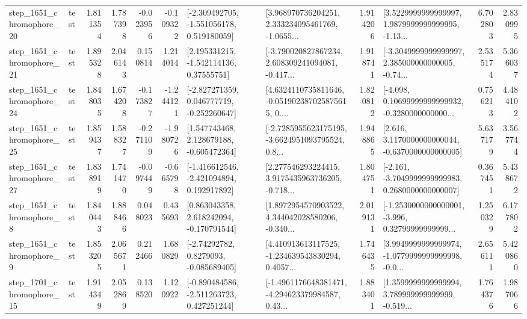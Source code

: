 \begin{tabular}{llrrrrllrlrr}
 step\_1651\_chromophore\_20 &      test &      1.811354 &    1.787398 &     -0.023956 & -0.109322 &   [-2.309492705, -1.551056178, 0.519180059] &  [3.968970736204251, 2.333234095461769, -1.0655... &       1.914206 &  [3.5229999999999997, 1.9879999999999995, -1.13... &            6.702803 &          2.830995 \\
 step\_1651\_chromophore\_21 &      test &      1.895328 &    2.046143 &      0.150814 &  1.214014 &     [2.195331215, -1.542114136, 0.37555751] &  [-3.790020827867234, 2.608309241094081, -0.417... &       1.918741 &  [-3.3049999999999997, 2.385000000000005, -0.74... &            2.535174 &          5.366037 \\
 step\_1651\_chromophore\_24 &      test &      1.848035 &    1.674208 &     -0.173827 & -1.244121 &   [-2.827271359, 0.046777719, -0.252260647] &  [4.6324110735811646, -0.051902387025875615, 0.... &       1.820812 &  [-4.098, 0.10699999999999932, -0.3280000000000... &            0.756213 &          4.484102 \\
 step\_1651\_chromophore\_25 &      test &      1.859437 &    1.588327 &     -0.271109 & -1.980726 &    [1.547743468, 2.128679188, -0.605472364] &  [-2.7285955623175195, -3.6624951093795524, 0.8... &       1.948865 &   [2.616, 3.1170000000000044, -0.6370000000000005] &            5.637179 &          3.567744 \\
 step\_1651\_chromophore\_27 &      test &      1.838919 &    1.741470 &     -0.097449 & -0.665798 &   [-1.416612546, -2.421094894, 0.192917892] &  [2.277546293224415, 3.9175435963736205, -0.718... &       1.804751 &  [-2.161, -3.7049999999999983, 0.2680000000000007] &            0.367451 &          5.438672 \\
  step\_1651\_chromophore\_8 &      test &      1.840443 &    1.888466 &      0.048023 &  0.435693 &    [0.863043358, 2.618242094, -0.170791544] &  [1.8972954570903522, 4.344042028580206, -0.340... &       2.019131 &  [-1.2530000000000001, -3.996, 0.32799999999999... &            1.250329 &          6.177802 \\
  step\_1651\_chromophore\_9 &      test &      1.853205 &    2.065671 &      0.212466 &  1.680829 &      [-2.74292782, 0.8279093, -0.085689405] &  [4.410913613117525, -1.234639543830294, 0.4057... &       1.746435 &  [3.9949999999999974, -1.0779999999999998, -0.0... &            2.656111 &          5.420860 \\
 step\_1701\_chromophore\_15 &      test &      1.914349 &    2.052869 &      0.138520 &  1.120922 &   [-0.890484586, -2.511263723, 0.427251244] &  [-1.4961176648381471, -4.294623379984587, 0.43... &       1.883401 &  [1.3599999999999994, 3.789999999999999, -0.519... &            1.764376 &          1.987066 \\

\end{tabular}
